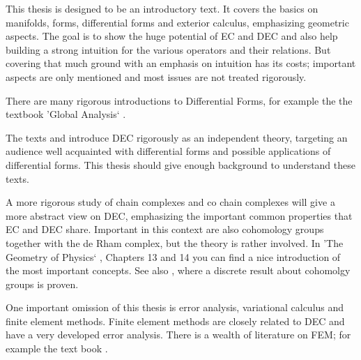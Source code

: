 This thesis is designed to be an introductory text. It covers the  basics on manifolds, forms, differential forms and exterior calculus, emphasizing geometric aspects. The goal is to show the huge potential of EC and DEC and also help building a strong intuition for the various operators and their relations. But covering that much ground with an emphasis on intuition has its costs; important aspects are only mentioned and most issues are not treated rigorously.


There are many rigorous introductions to Differential Forms, for example the the textbook 'Global Analysis` \cite{globalAnalysis}. 

The texts \cite{hirani03} and \cite{DECdesbrunEtAl} introduce DEC rigorously as an independent theory, targeting an audience well acquainted with differential forms and possible applications of differential forms. This thesis should give enough background to understand these texts. 

A more rigorous study of chain complexes and co chain complexes will give a more abstract view on DEC, emphasizing the important common properties that EC and DEC share. Important in this context are also cohomology groups together with the de Rham complex, but the theory is rather involved. In 'The Geometry of Physics` \cite{FRANKEL11}, Chapters 13 and 14 you can find a nice introduction of the most important concepts. See also \cite{DMK08}, where a discrete result about cohomolgy groups is proven. 

One important omission of this thesis is error analysis, variational calculus and finite element methods. Finite element methods are closely related to DEC and have a very developed error analysis. There is a wealth of literature on FEM; for example the text book \cite{citeulike:4388136}.